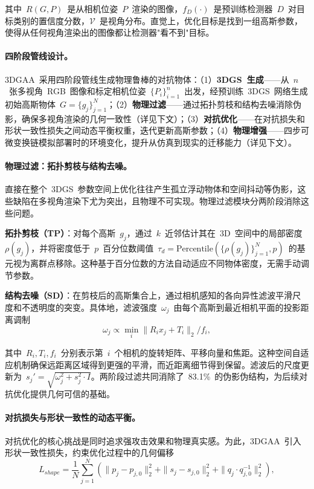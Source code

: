 其中~$R(G, P)$~是从相机位姿~$P$~渲染的图像，$f_D(\cdot)$~是预训练检测器~$D$~对目标类别的置信度分数，$\mathcal{V}$~是视角分布。直觉上，优化目标是找到一组高斯参数，使得从任何视角渲染出的图像都让检测器"看不到"目标。

\paragraph{四阶段管线设计。}
3DGAA~采用四阶段管线生成物理鲁棒的对抗物体：（1）\textbf{3DGS~生成}——从~$n$~张多视角~RGB~图像和标定相机位姿~$\{P_i\}_{i=1}^n$~出发，经预训练~3DGS~网络生成初始高斯物体~$G = \{g_j\}_{j=1}^N$；（2）\textbf{物理过滤}——通过拓扑剪枝和结构去噪消除伪影，确保多视角渲染的几何一致性（详见下文）；（3）\textbf{对抗优化}——在对抗损失和形状一致性损失之间动态平衡权重，迭代更新高斯参数；（4）\textbf{物理增强}——四步可微变换链模拟部署时的环境变化，提升从仿真到现实的迁移能力（详见下文）。

\paragraph{物理过滤：拓扑剪枝与结构去噪。}
直接在整个~3DGS~参数空间上优化往往产生孤立浮动物体和空间抖动等伪影，这些缺陷在多视角渲染下尤为突出，且物理不可实现。物理过滤模块分两阶段消除这些问题。

\textbf{拓扑剪枝（TP）}：对每个高斯~$g_j$，通过~$k$~近邻估计其在~3D~空间中的局部密度~$\rho(g_j)$，并将密度低于~$p$~百分位数阈值~$\tau_d = \text{Percentile}(\{\rho(g_j)\}_{j=1}^N, p)$~的基元视为离群点移除。这种基于百分位数的方法自动适应不同物体密度，无需手动调节参数。

\textbf{结构去噪（SD）}：在剪枝后的高斯集合上，通过相机感知的各向异性滤波平滑尺度和不透明度的突变。具体地，滤波强度~$\omega_j$~由每个高斯到最近相机平面的投影距离调制
\begin{equation}
    \omega_j \propto \min_i \|R_i x_j + T_i\|_2 / f_i,
\end{equation}

其中~$R_i, T_i, f_i$~分别表示第~$i$~个相机的旋转矩阵、平移向量和焦距。这种空间自适应机制确保远距离区域得到更强的平滑，而近距离细节得到保留。滤波后的尺度更新为~$s_j' = \sqrt{\omega_j^2 + s_j^2 \cdot I}$。两阶段过滤共同消除了~83.1\%~的伪影伪结构，为后续对抗优化提供几何可信的基础。

\paragraph{对抗损失与形状一致性的动态平衡。}
对抗优化的核心挑战是同时追求强攻击效果和物理真实感。为此，3DGAA~引入形状一致性损失，约束优化过程中的几何偏移
\begin{equation}
    L_{shape} = \frac{1}{N} \sum_{j=1}^N \left( \|p_j - p_{j,0}\|_2^2 + \|s_j - s_{j,0}\|_2^2 + \|q_j \cdot q_{j,0}^{-1}\|_2^2 \right),
\end{equation}

